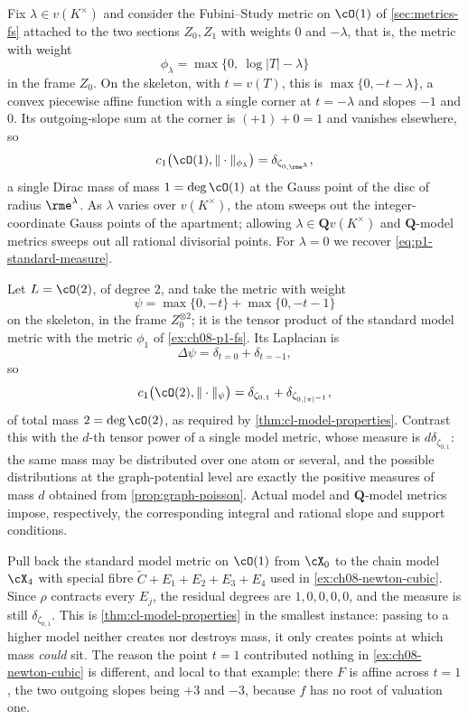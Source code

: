 \begin{example}
\label{ex:ch08-p1-fs}
Fix $\lambda\in v(K^\times)$ and consider the Fubini--Study metric on
$\cO(1)$ of \cref{sec:metrics-fs} attached to the two sections $Z_0,Z_1$
with weights $0$ and $-\lambda$, that is, the metric with weight
\[
 \phi_\lambda=\max\{0,\ \log|T|-\lambda\}
\]
in the frame $Z_0$.  On the skeleton, with $t=v(T)$, this is
$\max\{0,-t-\lambda\}$, a convex piecewise affine function with a single
corner at $t=-\lambda$ and slopes $-1$ and $0$.  Its outgoing-slope sum at
the corner is $(+1)+0=1$ and vanishes elsewhere, so
\[
 c_1\bigl(\cO(1),\|\cdot\|_{\phi_\lambda}\bigr)=\delta_{\zeta_{0,\rme^{\lambda}}} ,
\]
a single Dirac mass of mass $1=\deg\cO(1)$ at the Gauss point of the disc of
radius $\rme^{\lambda}$.  As $\lambda$ varies over $v(K^\times)$, the atom
sweeps out the integer-coordinate Gauss points of the apartment; allowing
$\lambda\in\mathbf Qv(K^\times)$ and $\mathbf Q$-model metrics sweeps out
all rational divisorial points.  For $\lambda=0$ we
recover \eqref{eq:p1-standard-measure}.
\end{example}

\begin{example}
\label{ex:ch08-p1-degree-two}
Let $L=\cO(2)$, of degree $2$, and take the metric with weight
\[
 \psi=\max\{0,-t\}+\max\{0,-t-1\}
\]
on the skeleton, in the frame $Z_0^{\otimes2}$; it is the tensor product of
the standard model metric with the metric $\phi_1$ of
\cref{ex:ch08-p1-fs}.  Its Laplacian is
\[
 \Delta\psi=\delta_{t=0}+\delta_{t=-1},
\]
so
\[
 c_1\bigl(\cO(2),\|\cdot\|_\psi\bigr)
   =\delta_{\zeta_{0,1}}+\delta_{\zeta_{0,|\pi|^{-1}}} ,
\]
of total mass $2=\deg\cO(2)$, as required by
\cref{thm:cl-model-properties}.  Contrast this with the $d$-th tensor power
of a single model metric, whose measure is $d\delta_{\zeta_{0,1}}$: the same
mass may be distributed over one atom or several, and the possible
distributions at the graph-potential level are exactly the positive measures
of mass $d$ obtained from \cref{prop:graph-poisson}.  Actual model and
$\mathbf Q$-model metrics impose, respectively, the corresponding integral
and rational slope and support conditions.
\end{example}

\begin{example}
\label{ex:ch08-p1-refinement}
Pull back the standard model metric on $\cO(1)$ from $\cX_0$ to the chain
model $\cX_4$ with special fibre $\widetilde C+E_1+E_2+E_3+E_4$ used in
\cref{ex:ch08-newton-cubic}.  Since $\rho$ contracts every $E_j$, the
residual degrees are $1,0,0,0,0$, and the measure is still
$\delta_{\zeta_{0,1}}$.  This is \cref{thm:cl-model-properties} in the
smallest instance: passing to a higher model neither creates nor destroys
mass, it only creates points at which mass \emph{could} sit.  The reason the
point $t=1$ contributed nothing in \cref{ex:ch08-newton-cubic} is different,
and local to that example: there $F$ is affine across $t=1$, the two
outgoing slopes being $+3$ and $-3$, because $f$ has no root of valuation
one.
\end{example}

